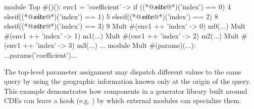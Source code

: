 \begin{phdl}
module Top #()():
  env1 = {'coefficient' -> if    ((*@\textcolor[rgb]{1,0.5,0}{\textbf{\textit{site}}}@*)('index') == 0) 4 
                           elseif((*@\textcolor[rgb]{1,0.5,0}{\textbf{\textit{site}}}@*)('index') == 1) 5
                           elseif((*@\textcolor[rgb]{1,0.5,0}{\textbf{\textit{site}}}@*)('index') == 2) 8
                           elseif((*@\textcolor[rgb]{1,0.5,0}{\textbf{\textit{site}}}@*)('index') == 3) 9}                        
  Mult #(env1 ++ {'index' -> 0}) m0(...)
  Mult #(env1 ++ {'index' -> 1}) m1(...)
  Mult #(env1 ++ {'index' -> 2}) m2(...)
  Mult #(env1 ++ {'index' -> 3}) m3(...) ...
module Mult #(params)(...):
  ...params('coefficient')...
\end{phdl}

The top-level parameter assignment may dispatch different values to the same query by using the geographic information known only at the origin of the query. 
This example demonstrates how components in a generator library built around CDEs can leave a hook (e.g. ) by which external modules can specialize them.




